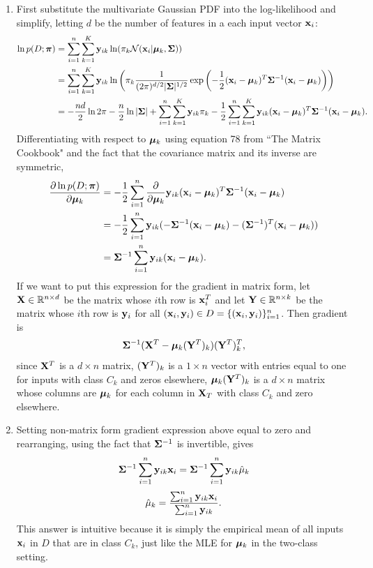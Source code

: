 \documentclass[submit]{harvardml}
\begin{document}
\begin{enumerate}
	\item First substitute the multivariate Gaussian PDF into the log-likelihood and simplify, letting $d$ be the number of features in a each input vector $\mathbf{x}_i$:
	\begin{align*}
		\ln p(D; \boldsymbol{\pi}) &= \sum_{i=1}^n \sum_{k=1}^K \mathbf{y}_{ik} \ln(\pi_k \mathcal{N}(\mathbf{x}_i |  \boldsymbol{\mu}_k, \mathbf{\Sigma})) \\
		&= \sum_{i=1}^n \sum_{k=1}^K \mathbf{y}_{ik} \ln \left(\pi_k \frac{1}{(2\pi)^{d/2} |\mathbf{\Sigma}|^{1/2}} \exp \left(-\frac12(\mathbf{x}_i - \boldsymbol{\mu}_k)^T \mathbf{\Sigma}^{-1} (\mathbf{x}_i - \boldsymbol{\mu}_k) \right) \right) \\
		&= -\frac{nd}{2}\ln2\pi - \frac{n}{2}\ln |\mathbf{\Sigma}| + \sum_{i=1}^{n}\sum_{k=1}^K \mathbf{y}_{ik} \pi_k -\frac12 \sum_{i=1}^{n}\sum_{k=1}^K \mathbf{y}_{ik} (\mathbf{x}_i - \boldsymbol{\mu}_k)^T \mathbf{\Sigma}^{-1} (\mathbf{x}_i - \boldsymbol{\mu}_k).
	\end{align*}
	Differentiating with respect to $\boldsymbol{\mu}_k$ using equation 78 from ``The Matrix Cookbook" and the fact that the covariance matrix and its inverse are symmetric,
	\begin{align*}
		\frac{\partial \ln p(D; \boldsymbol{\pi})}{\partial \boldsymbol{\mu}_k} &= -\frac12 \sum_{i=1}^{n} \frac{\partial}{\partial \boldsymbol{\mu}_k} \mathbf{y}_{ik} (\mathbf{x}_i - \boldsymbol{\mu}_k)^T \mathbf{\Sigma}^{-1} (\mathbf{x}_i - \boldsymbol{\mu}_k) \\
		&= -\frac12 \sum_{i=1}^{n} \mathbf{y}_{ik} (-\mathbf{\Sigma}^{-1}(\mathbf{x}_i - \boldsymbol{\mu}_k) - (\mathbf{\Sigma}^{-1})^T (\mathbf{x}_i - \boldsymbol{\mu}_k)) \\
		&= \mathbf{\Sigma}^{-1} \sum_{i=1}^{n} \mathbf{y}_{ik} (\mathbf{x}_i - \boldsymbol{\mu}_k).
	\end{align*}
	If we want to put this expression for the gradient in matrix form, let $\mathbf{X} \in \mathbb{R}^{n \times d}$ be the matrix whose $i$th row is $\mathbf{x}_i^T$ and let $\mathbf{Y} \in \mathbb{R}^{n \times k}$ be the matrix whose $i$th row is $\mathbf{y}_{i}$ for all $(\mathbf{x}_i, \mathbf{y}_i) \in D = \{(\mathbf{x}_i, \mathbf{y}_i)\}_{i=1}^n$. Then gradient is
	$$\mathbf{\Sigma}^{-1} (\mathbf{X}^T - \boldsymbol{\mu}_k (\mathbf{Y}^T)_k) (\mathbf{Y}^T)_k^T,$$
	since $\mathbf{X}^T$ is a $d \times n$ matrix, $(\mathbf{Y}^T)_k$ is a $1 \times n$ vector with entries equal to one for inputs with class $C_k$ and zeros elsewhere, $\boldsymbol{\mu}_k (\mathbf{Y}^T)_k$ is a $d \times n$ matrix whose columns are $\boldsymbol{\mu}_k$ for each column in $\mathbf{X}_T$ with class $C_k$ and zero elsewhere.
	
	\item Setting non-matrix form gradient expression above equal to zero and rearranging, using the fact that $\mathbf{\Sigma}^{-1}$ is invertible, gives
	$$\mathbf{\Sigma}^{-1} \sum_{i=1}^{n} \mathbf{y}_{ik} \mathbf{x}_i =  \mathbf{\Sigma}^{-1} \sum_{i=1}^{n} \mathbf{y}_{ik} \hat \mu_k$$
	$$\hat \mu_k = \frac{\sum_{i=1}^n \mathbf{y}_{ik} \mathbf{x}_i}{\sum_{i=1}^n \mathbf{y}_{ik}}.$$
	This answer is intuitive because it is simply the empirical mean of all inputs $\mathbf{x}_i$ in $D$ that are in class $C_k$, just like the MLE for $\boldsymbol{\mu}_k$ in the two-class setting.
	

\end{enumerate}
\end{document}
